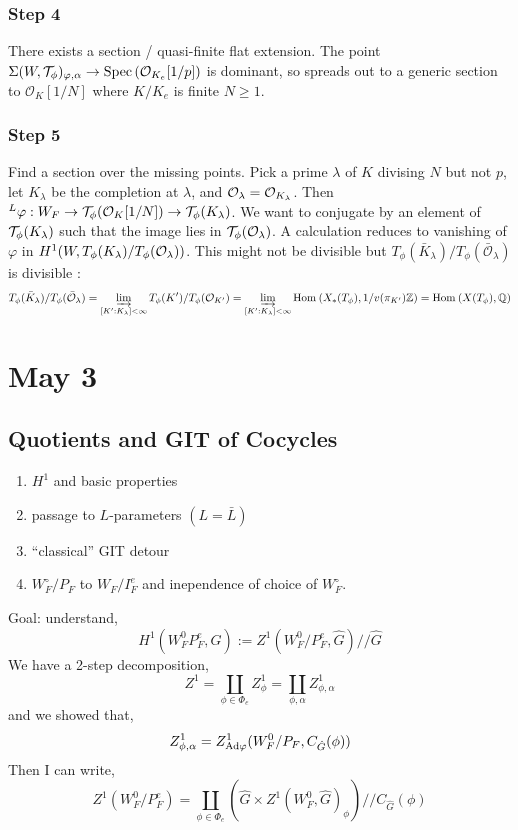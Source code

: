 \documentclass[12pt]{article}
\begin{document}
\subsubsection{Step 4}

There exists a section / quasi-finite flat extension. The point $\Sigma(W, \mathcal{T}_\phi)_{\varphi, \alpha} \to \mathrm{Spec}\left( \mathcal{O}_{K_e}[1/p] \right)$ is dominant, so spreads out to a generic section to $\mathcal{O}_K[1/N]$ where $K/K_e$ is finite $N \ge 1$. 

\subsubsection{Step 5}

Find a section over the missing points. Pick a prime $\lambda$ of $K$ divising $N$ but not $p$, let $K_\lambda$ be the completion at $\lambda$, and $\mathcal{O}_{\lambda} = \mathcal{O}_{K_\lambda}$. Then ${}^L \varphi : W_F \to \mathcal{T}_\phi(\mathcal{O}_K[1/N]) \to \mathcal{T}_\phi(K_\lambda)$. We want to conjugate by an element of $\mathcal{T}_\phi(K_\lambda)$ such that the image lies in $\mathcal{T}_\phi(\mathcal{O}_\lambda)$. A calculation reduces to vanishing of $\varphi$ in $H^1(W, T_\phi(K_\lambda) / T_\phi(\mathcal{O}_{\lambda}))$. This might not be divisible but $T_\phi(\bar{K}_\lambda) / T_\phi(\bar{\mathcal{O}}_\lambda)$ is divisible :
\[ T_\phi(\bar{K}_\lambda) / T_\phi(\bar{\mathcal{O}}_\lambda) = \varinjlim_{[K' : K_\lambda] < \infty} T_\phi(K') / T_\phi(\mathcal{O}_{K'}) = \varinjlim_{[K' : K_\lambda] < \infty} \mathrm{Hom}_{} \left( X_*(T_\phi), 1/v(\pi_{K'}) \mathbb{Z} \right) = \mathrm{Hom}_{} \left( X(T_\phi), \mathbb{Q} \right) \] 

\section{May 3}

\subsection{Quotients and GIT of Cocycles}

\begin{enumerate}
\item $H^1$ and basic properties
\item passage to $L$-parameters $(L = \bar{L})$
\item ``classical'' GIT detour
\item $W_F^\circ / P_F$ to $W_F / I_F^e$ and inependence of choice of $W_F^\circ$.
\end{enumerate}

Goal: understand,
\[ H^1(W_F^0P_F^e, \hat{G}) := Z^1(W_F^0/P_F^e, \hat{G}) // \hat{G} \]
We have a 2-step decomposition,
\[ Z^1 = \coprod_{\phi \in \Phi_e} Z^1_{\phi} = \coprod_{\phi, \alpha} Z^1_{\phi, \alpha} \]
and we showed that,
\[ Z^1_{\phi, \alpha} = Z^1_{\mathrm{Ad} \varphi}(W_F^0/P_F, C_{\hat{G}}(\phi)) \]
Then I can write,
\[ Z^1(W_F^0/P_F^e) = \coprod_{\phi \in \Phi_e} (\hat{G} \times Z^1(W_F^0, \hat{G})_{\phi})//C_{\hat{G}}(\phi) \]
\end{document}
